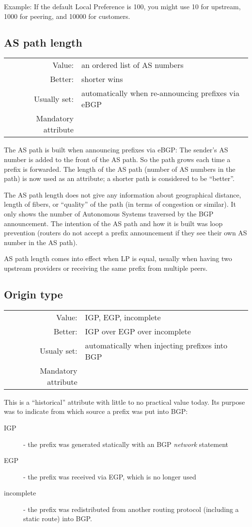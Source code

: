 Example: If the default Local Preference is 100, you might use 10 for upstream, 1000 for peering, and 10000 for customers.

\subsection{AS path length}
\begin{tabular}{r p{\linewidth}}
Value: & an ordered list of AS numbers\\
Better: & shorter wins \\
Usually set: & automatically when re-announcing prefixes via eBGP \\
Mandatory attribute \\
\end{tabular}

The AS path is built when announcing prefixes via eBGP: The sender's AS number is added to the front of the AS path. So the path grows each time a prefix is forwarded. The length of the AS path (number of AS numbers in the path) is now used as an attribute; a shorter path is considered to be ``better''.

The AS path length does not give any information about geographical distance, length of fibers, or ``quality'' of the path (in terms of congestion or similar). It only shows the number of Autonomous Systems traversed by the BGP announcement. The intention  of the AS path and how it is built was loop prevention (routers do not accept a prefix announcement if they see their own AS number in the AS path).

AS path length comes into effect when \gls{LP} is equal, usually when having two upstream providers or receiving the same prefix from multiple peers.

\subsection{Origin type}
\begin{tabular}{r p{\linewidth}}
Value: & IGP, EGP, incomplete\\
Better: & IGP over EGP over incomplete \\
Usualy set: & automatically when injecting prefixes into BGP \\
Mandatory attribute \\
\end{tabular}

This is a ``historical'' attribute with little to no practical value today. Its purpose was to indicate from which source a prefix was put into BGP:
\begin{description}
  \item[IGP] - the prefix was generated statically with an BGP \emph{network} statement
  \item[EGP] - the prefix was received via \acrfull{EGP}, which is no longer used
  \item[incomplete] - the prefix was redistributed from another routing protocol (including a static route) into BGP.
\end{description}

